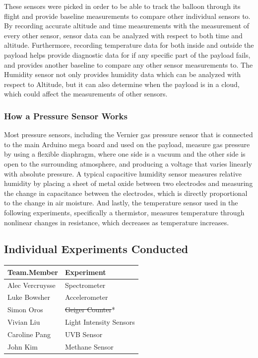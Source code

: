 \documentclass[12pt,]{article}
\begin{document}
These sensors were picked in order to be able to track the balloon
through its flight and provide baseline measurements to compare other
individual sensors to. By recording accurate altitude and time
measurements with the measurement of every other sensor, sensor data can
be analyzed with respect to both time and altitude. Furthermore,
recording temperature data for both inside and outside the payload helps
provide diagnostic data for if any specific part of the payload fails,
and provides another baseline to compare any other sensor measurements
to. The Humidity sensor not only provides humidity data which can be
analyzed with respect to Altitude, but it can also determine when the
payload is in a cloud, which could affect the measurements of other
sensors.

\subsubsection{How a Pressure Sensor
Works}\label{how-a-pressure-sensor-works}

Most pressure sensors, including the Vernier gas pressure sensor that is
connected to the main Arduino mega board and used on the payload,
measure gas pressure by using a flexible diaphragm, where one side is a
vacuum and the other side is open to the surrounding atmosphere, and
producing a voltage that varies linearly with absolute pressure. A
typical capacitive humidity sensor measures relative humidity by placing
a sheet of metal oxide between two electrodes and measuring the change
in capacitance between the electrodes, which is directly proportional to
the change in air moisture. And lastly, the temperature sensor used in
the following experiments, specifically a thermistor, measures
temperature through nonlinear changes in resistance, which decreases as
temperature increases.

\subsection{Individual Experiments
Conducted}\label{individual-experiments-conducted}

\begin{longtable}[]{@{}ll@{}}
\toprule
Team.Member & Experiment\tabularnewline
\midrule
\endhead
Alec Vercruysse & Spectrometer\tabularnewline
Luke Bowsher & Accelerometer\tabularnewline
Simon Oros & \sout{Geiger Counter}*\tabularnewline
Vivian Liu & Light Intensity Sensors\tabularnewline
Caroline Pang & UVB Sensor\tabularnewline
John Kim & Methane Sensor\tabularnewline
\bottomrule
\end{longtable}
\end{document}
